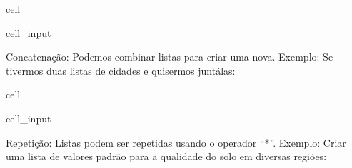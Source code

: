 \documentclass[letterpaper,10pt,english]{jupyterBook}
\begin{document}
\begin{sphinxuseclass}{cell}\begin{sphinxVerbatimInput}

\begin{sphinxuseclass}{cell_input}
\begin{sphinxVerbatim}[commandchars=\\\{\}]
  \PYG{p}{[}       \PYG{p}{]}
  \PYG{p}{[}\PYG{p}{]}
  
\end{sphinxVerbatim}

\end{sphinxuseclass}\end{sphinxVerbatimInput}

\end{sphinxuseclass}
\sphinxAtStartPar
Concatenação: Podemos combinar listas para criar uma nova. Exemplo: Se tivermos duas listas de cidades e quisermos juntá\sphinxhyphen{}las:

\begin{sphinxuseclass}{cell}\begin{sphinxVerbatimInput}

\begin{sphinxuseclass}{cell_input}
\begin{sphinxVerbatim}[commandchars=\\\{\}]
  \PYG{p}{[} \PYG{p}{]}
  \PYG{p}{[} \PYG{p}{]}
    
  
\end{sphinxVerbatim}

\end{sphinxuseclass}\end{sphinxVerbatimInput}

\end{sphinxuseclass}
\sphinxAtStartPar
Repetição: Listas podem ser repetidas usando o operador “*”. Exemplo: Criar uma lista de valores padrão para a qualidade do solo em diversas regiões:
\end{document}
